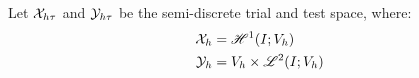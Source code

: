 \begin{frame}
\begin{center}
        \begin{minipage}{0.75\textwidth}
            \begin{definition}
                Let $\mathcal{X}_{h \tau}$ and $\mathcal{Y}_{h \tau}$ be the semi-discrete trial and test space, where:
                \begin{align*}
                    \mathcal{X}_{h} &= \mathscr{H}^{1}(I; V_h) \\
                    \mathcal{Y}_{h} &= V_h \times \mathscr{L}^{2}(I; V_h)
                \end{align*}
            \end{definition}
        \end{minipage}
    \end{center}
    \vspace*{\fill}
    
\end{frame}

